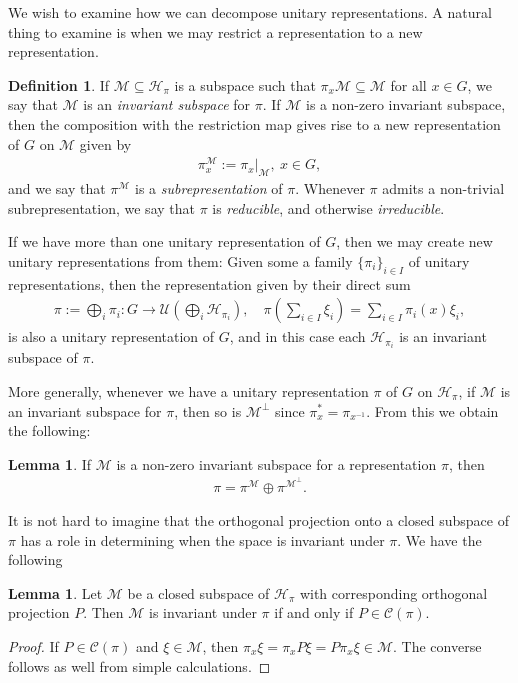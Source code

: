 \documentclass[10pt,twoside,openany,final]{memoir}
\theoremstyle{definition}
\newtheorem{lemma}[theorem]{Lemma}
\newtheorem{definition}[theorem]{Definition}
\theoremstyle{Break}
\renewcommand{\H}{\mathcal{H}}
\begin{document}
We wish to examine how we can decompose unitary representations. A natural thing to examine is when we may restrict a representation to a new representation.
\begin{definition}
If $\mathcal{M} \subseteq \H_\pi$ is a subspace such that $\pi_x \mathcal{M} \subseteq \mathcal{M}$ for all $x \in G$, we say that $\mathcal{M}$ is an \emph{invariant subspace} for $\pi$. If $\mathcal{M}$ is a non-zero invariant subspace, then the composition with the restriction map gives rise to a new representation of $G$ on $\mathcal{M}$ given by
\begin{align*}
	\pi_x^{\mathcal{M}}:=\pi_x|_{\mathcal{M}}, \ x \in G,
\end{align*}
and we say that $\pi^{\mathcal{M}}$ is a \emph{subrepresentation} of $\pi$. Whenever $\pi$ admits a non-trivial subrepresentation, we say that $\pi$ is \emph{reducible}, and otherwise \emph{irreducible}.
\end{definition}
If we have more than one unitary representation of $G$, then we may create new unitary representations from them: Given some a family $\{\pi_i\}_{i \in I}$ of unitary representations, then the representation given by their direct sum 
\begin{align*}
\pi:=\bigoplus_i \pi_i \colon G \to  \mathcal{U}\left(\bigoplus_i \H_{\pi_i}\right), \quad \pi\left(\sum_{i \in I}\xi_i\right)=\sum_{i \in I}\pi_i(x)\xi_i,
\end{align*}
is also a unitary representation of $G$, and in this case each $\H_{\pi_i}$ is an invariant subspace of $\pi$.

More generally, whenever we have a unitary representation $\pi$ of $G$ on $\H_\pi$, if $\mathcal{M}$ is an invariant subspace for $\pi$, then so is $\mathcal{M}^\perp$ since $\pi_x^*=\pi_{x^{-1}}$. From this we obtain the following:
\begin{lemma}
If $\mathcal{M}$ is a non-zero invariant subspace for a representation $\pi$, then 
\begin{align*}
	\pi=\pi^{\mathcal{M}}\oplus \pi^{\mathcal{M}^\perp}.
\end{align*}
\label{3.1}
\end{lemma}
It is not hard to imagine that the orthogonal projection onto a closed subspace of $\pi$ has a role in determining when the space is invariant under $\pi$. We have the following
\begin{lemma}
Let $\mathcal{M}$ be a closed subspace of $\H_\pi$ with corresponding orthogonal projection $P$. Then $\mathcal{M}$ is invariant under $\pi$ if and only if $P \in \mathcal{C}(\pi)$.	
\label{3.4}
\end{lemma}
\begin{proof}
If $P \in \mathcal{C}(\pi)$ and $\xi \in \mathcal{M}$, then $\pi_x \xi = \pi_x P \xi = P \pi_x \xi \in \mathcal{M}$. The converse follows as well from simple calculations.
\end{proof}
\end{document}
